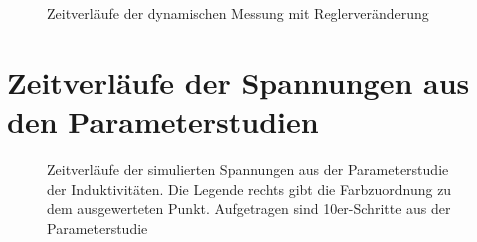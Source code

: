 \begin{landscape}
\begin{figure}
    \centering
    \caption{Zeitverläufe der dynamischen Messung mit Reglerveränderung}
    \label{fig:MessungReglerSweep}
\end{figure}
\end{landscape}

\section{Zeitverläufe der Spannungen aus den Parameterstudien}
\begin{figure}[!ht]
    \centering
    \begin{subfigure}{\linewidth}
        \centering
        \label{fig:InduktivitatenSweepA}
    \end{subfigure}
    \caption{Zeitverläufe der simulierten Spannungen aus der Parameterstudie der Induktivitäten. Die Legende rechts gibt die Farbzuordnung zu dem ausgewerteten Punkt. Aufgetragen sind 10er-Schritte aus der Parameterstudie}
\end{figure}

